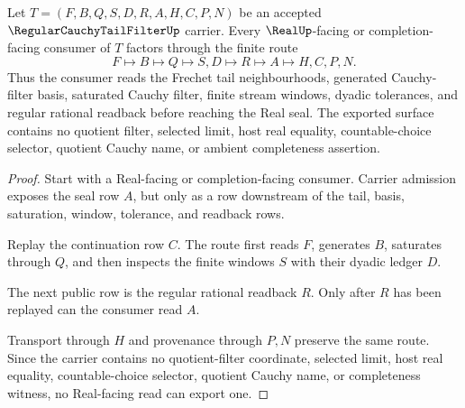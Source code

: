 \begin{theorem}
\label{thm:regular-cauchy-tail-filter-real-seal-boundary}
Let $T=(F,B,Q,S,D,R,A,H,C,P,N)$ be an accepted $\RegularCauchyTailFilterUp$ carrier. Every $\RealUp$-facing or completion-facing consumer of $T$ factors through the finite route
$$
F \longmapsto B \longmapsto Q \longmapsto S,D \longmapsto R \longmapsto A \longmapsto H,C,P,N .
$$
Thus the consumer reads the Frechet tail neighbourhoods, generated Cauchy-filter basis, saturated Cauchy filter, finite stream windows, dyadic tolerances, and regular rational readback before reaching the Real seal. The exported surface contains no quotient filter, selected limit, host real equality, countable-choice selector, quotient Cauchy name, or ambient completeness assertion.
\end{theorem}
\begin{proof}
Start with a Real-facing or completion-facing consumer. Carrier admission exposes the seal row $A$, but only as a row downstream of the tail, basis, saturation, window, tolerance, and readback rows.

Replay the continuation row $C$. The route first reads $F$, generates $B$, saturates through $Q$, and then inspects the finite windows $S$ with their dyadic ledger $D$.

The next public row is the regular rational readback $R$. Only after $R$ has been replayed can the consumer read $A$.

Transport through $H$ and provenance through $P,N$ preserve the same route. Since the carrier contains no quotient-filter coordinate, selected limit, host real equality, countable-choice selector, quotient Cauchy name, or completeness witness, no Real-facing read can export one.
\end{proof}

